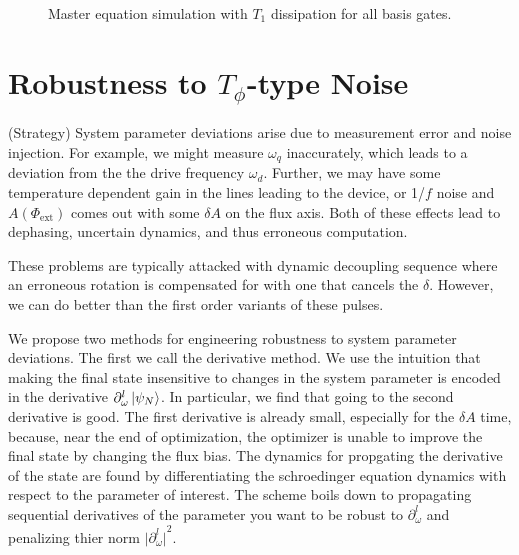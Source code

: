 \documentclass[
  amsfonts,
  amsmath,
  tbtags,
  amssymb,
  aps,
  nobibnotes,
  prl,
  twocolumn,
]{revtex4-2}
\begin{document}
\begin{figure}[ht]
  \begin{subfigure}{.33\textwidth}
    \label{fig:sub-first}
  \end{subfigure}
  \begin{subfigure}{.33\textwidth}
    \label{fig:sub-second}
  \end{subfigure}
  \begin{subfigure}{.33\textwidth}
    \label{fig:sub-third}
  \end{subfigure}
  \caption{Master equation simulation with $T_{1}$ dissipation for all basis gates.}
  \label{fig:fig}
\end{figure}


\section{Robustness to $T_{\phi}$-type Noise}
(Strategy) System parameter deviations arise due to
measurement error and noise injection. For example,
we might measure $\omega_{q}$ inaccurately,
which leads to a deviation from
the the drive frequency $\omega_{d}$.
Further, we may have some temperature dependent gain
in the lines leading to the device, or 1/$f$ noise
and $A(\Phi_{\textrm{ext}})$ comes out with some
$\delta A$ on the flux axis.
Both of these effects lead to dephasing,
uncertain dynamics, and thus erroneous computation.

These problems are typically attacked with dynamic decoupling
sequence where an erroneous rotation is compensated for with
one that cancels the $\delta$. However, we can do better
than the first order variants of these pulses.

We propose two methods for engineering robustness
to system parameter deviations. The first we call the
derivative method. We use the intuition that
making the final state insensitive to changes
in the system parameter is encoded in the derivative
$\partial_{\omega}^{l} \ket{\psi_{N}}$.
In particular, we find that going to the second
derivative is good. The first derivative is already
small, especially for the $\delta A$ time, because,
near the end of optimization, the
optimizer is unable to improve the final state by
changing the flux bias.
The dynamics for propgating the derivative of the state
are found by differentiating the schroedinger equation
dynamics with respect to the parameter of interest.
The scheme boils down to propagating sequential
derivatives of the parameter you want to be
robust to $\partial_{\omega}^{l}$ and penalizing thier norm
${\lvert \partial_{\omega}^{l} \lvert}^{2}$.
\end{document}
